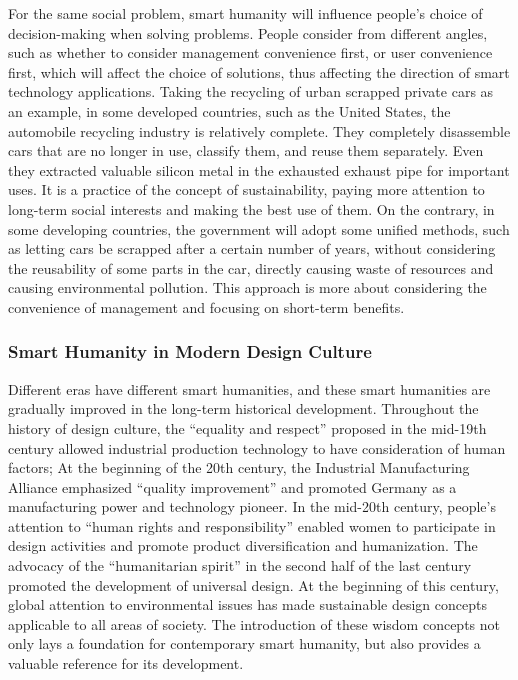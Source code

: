 \documentclass[letterpaper, twocolumn, 10pt, conference]{IEEEtran}
\begin{document}
For the same social problem, smart humanity will influence people's choice of decision-making when solving problems. People consider from different angles, such as whether to consider management convenience first, or user convenience first, which will affect the choice of solutions, thus affecting the direction of smart technology applications. Taking the recycling of urban scrapped private cars as an example, in some developed countries, such as the United States, the automobile recycling industry is relatively complete. They completely disassemble cars that are no longer in use, classify them, and reuse them separately. Even they extracted valuable silicon metal in the exhausted exhaust pipe for important uses. It is a practice of the concept of sustainability, paying more attention to long-term social interests and making the best use of them. On the contrary, in some developing countries, the government will adopt some unified methods, such as letting cars be scrapped after a certain number of years, without considering the reusability of some parts in the car, directly causing waste of resources and causing environmental pollution. This approach is more about considering the convenience of management and focusing on short-term benefits.

\subsubsection{Smart Humanity in Modern Design Culture}
\label{sssec:css:smart_humanity:design}

Different eras have different smart humanities, and these smart humanities are gradually improved in the long-term historical development. Throughout the history of design culture, the \enquote{equality and respect} proposed in the mid-19th century allowed industrial production technology to have consideration of human factors; At the beginning of the 20th century, the Industrial Manufacturing Alliance emphasized \enquote{quality improvement} and promoted Germany as a manufacturing power and technology pioneer. In the mid-20th century, people's attention to \enquote{human rights and responsibility} enabled women to participate in design activities and promote product diversification and humanization. The advocacy of the \enquote{humanitarian spirit} in the second half of the last century promoted the development of universal design. At the beginning of this century, global attention to environmental issues has made sustainable design concepts applicable to all areas of society. The introduction of these wisdom concepts not only lays a foundation for contemporary smart humanity, but also provides a valuable reference for its development.
\end{document}
